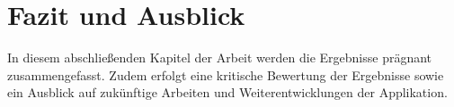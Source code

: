\newpage
\section{Fazit und Ausblick}
\label{sec:fazit-und-ausblick}

In diesem abschließenden Kapitel der Arbeit werden die Ergebnisse prägnant zusammengefasst.
Zudem erfolgt eine kritische Bewertung der Ergebnisse sowie ein Ausblick auf zukünftige Arbeiten und Weiterentwicklungen der Applikation.



